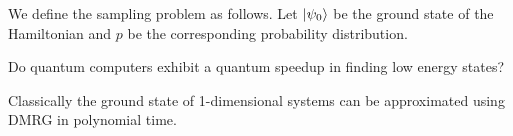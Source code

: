 \documentclass[twocolumn]{revtex4-2}
\begin{document}
We define the sampling problem as follows. Let $\ket{\psi_0}$ be the ground
state of the Hamiltonian and $p$ be the corresponding probability distribution.


Do quantum computers exhibit a quantum speedup in finding low
energy states?

Classically the ground state of 1-dimensional systems can be approximated using
DMRG in polynomial time.
\end{document}
